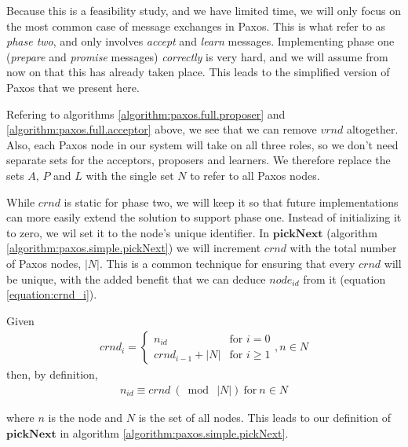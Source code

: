 Because this is a feasibility study, and we have limited time, we will only
focus on the most common case of message exchanges in Paxos.
%
This is what \cite{Lam01,Lamport:1998:PP:279227.279229} refer to as
\textit{phase two}, and only involves \textit{accept} and \textit{learn}
messages.
%
Implementing phase one (\textit{prepare} and \textit{promise} messages)
\textit{correctly} is very hard, and we will assume from now on that this
has already taken place.
%
This leads to the simplified version of Paxos that we present here.

Refering to algorithms \ref{algorithm:paxos.full.proposer} and
\ref{algorithm:paxos.full.acceptor} above, we see that we can remove
$vrnd$ altogether.
%
Also, each Paxos node in our system will take on all three roles, so we
don't need separate sets for the acceptors, proposers and learners.
%
We therefore replace the sets $A$, $P$ and $L$ with the single set $N$ to
refer to all Paxos nodes.

While $crnd$ is static for phase two, we will keep it so that future
implementations can more easily extend the solution to support phase one.
%
Instead of initializing it to zero, we wil set it to the node's unique
identifier.
%
In $\textbf{pickNext}$ (algorithm \ref{algorithm:paxos.simple.pickNext}) we
will increment $crnd$ with the total number of Paxos nodes, $|N|$.
%
This is a common technique for ensuring that every $crnd$ will be unique,
with the added benefit that we can deduce $node_{id}$ from it (equation
\ref{equation:crnd_i}).

Given
\begin{gather}
  crnd_i = \left\{
             \begin{array}{ll}
               n_{id} & \mbox{for } i = 0 \\
               crnd_{i-1} + |N| & \mbox{for } i \geq 1
             \end{array}
           \right. , n \in N
  \label{equation:crnd_i}
\end{gather}
then, by definition,
\begin{gather}
  n_{id} \equiv crnd\ (\bmod\ |N|)\ \text{for}\ n \in N
  \label{equation:crnd_mod_N}
\end{gather}

where $n$ is the node and $N$ is the set of all nodes.  This leads to our
definition of $\textbf{pickNext}$ in algorithm
\ref{algorithm:paxos.simple.pickNext}.

